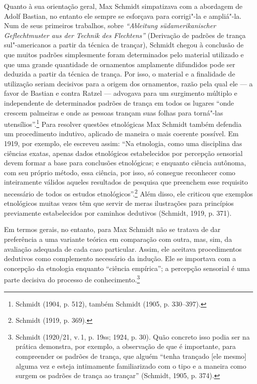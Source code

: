 Quanto à sua orientação geral, Max Schmidt simpatizava com a abordagem
de Adolf Bastian, no entanto ele sempre se esforçava para corrigi"-la e
ampliá"-la. Num de seus primeiros trabalhos, sobre \emph{``Ableitung
südamerikanischer Geflechtmuster aus der Technik des Flechtens''}
(Derivação de padrões de trança sul"-americanos a partir da técnica de
trançar), Schmidt chegou à conclusão de que muitos padrões simplesmente
foram determinados pelo material utilizado e que uma grande quantidade
de ornamentos amplamente difundidos pode ser deduzida a partir da
técnica de trança. Por isso, o material e a finalidade de utilização
seriam decisivos para a origem dos ornamentos, razão pela qual ele --- a
favor de Bastian e contra Ratzel --- advogava para um surgimento múltiplo
e independente de determinados padrões de trança em todos os lugares
``onde crescem palmeiras e onde as pessoas trançam suas folhas para
torná"-las utensílios''.\footnote{Schmidt (1904, p. 512), também Schmidt
  (1905, p. 330--397).} Para resolver questões etnológicas Max Schmidt
também defendia um procedimento indutivo, aplicado de maneira o mais
coerente possível. Em 1919, por exemplo, ele escreveu assim: ``Na
etnologia, como uma disciplina das ciências exatas, apenas dados
etnológicos estabelecidos por percepção sensorial devem formar a base
para conclusões etnológicas; e enquanto ciência autônoma, com seu
próprio método, essa ciência, por isso, só consegue reconhecer como
inteiramente válidos aqueles resultados de pesquisa que preenchem esse
requisito necessário de todos os estudos etnológicos''.\footnote{Schmidt
  (1919, p. 369).} Além disso, ele criticou que exemplos etnológicos
muitas vezes têm que servir de meras ilustrações para princípios
previamente estabelecidos por caminhos dedutivos (Schmidt, 1919, p.
371).

Em termos gerais, no entanto, para Max Schmidt não se tratava de dar
preferência a uma variante teórica em comparação com outra, mas, sim,
da avaliação adequada de cada caso particular. Assim, ele aceitava
procedimentos dedutivos como complemento necessário da indução. Ele se
importava com a concepção da etnologia enquanto ``ciência empírica''; a
percepção sensorial é uma parte decisiva do processo de
conhecimento.\footnote{Schmidt (1920/21, v.\,1, p. 19ss; 1924, p. 30).
  Quão concreto isso podia ser na prática demonstra, por exemplo, a
  observação de que é importante, para compreender os padrões de trança,
  que alguém ``tenha trançado {[}ele mesmo{]} alguma vez e esteja
  intimamente familiarizado com o tipo e a maneira como surgem os
  padrões de trança ao trançar'' (Schmidt, 1905, p. 374).}


